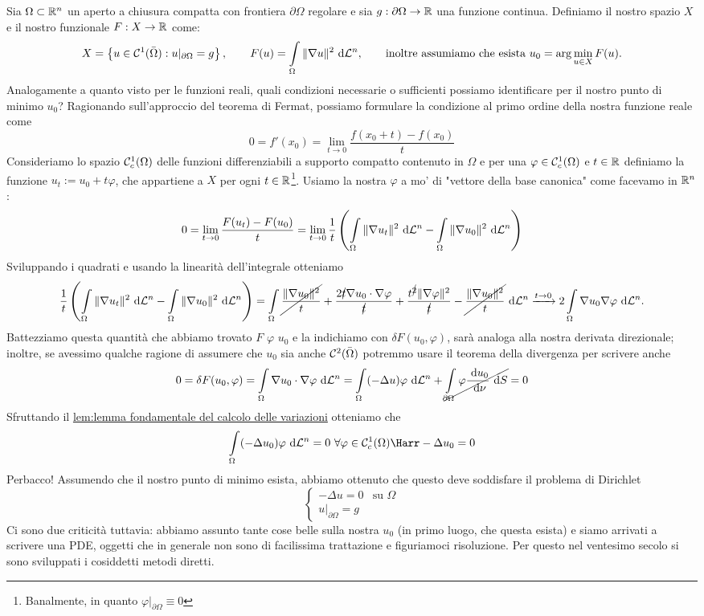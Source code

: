 \documentclass[openany]{book}
\begin{document}
Sia $\Omega\subset\mathbb{R}^n$ un aperto a chiusura compatta con frontiera $\partial\Omega$ regolare e sia $g : \partial\Omega\to\mathbb{R}$ una funzione continua. Definiamo il nostro spazio $X$ e il nostro funzionale $F : X\to\mathbb{R}$ come:
\[ X = \left\{ u \in \mc{C}^1(\bar{\Omega}) : u|_{\partial\Omega} = g \right\}, \qquad F(u) = \intop_\Omega \|\nabla u\|^2 \de \L^n, \qquad\text{inoltre assumiamo che esista } u_0 = \arg\min_{u \in X} F(u). \]
Analogamente a quanto visto per le funzioni reali, quali condizioni necessarie o sufficienti possiamo identificare per il nostro punto di minimo $u_0$? Ragionando sull'approccio del teorema di Fermat, possiamo formulare la condizione al primo ordine della nostra funzione reale come 
\[ 0 = f'(x_0) = \lim_{t\to 0} \frac{f(x_0+t) - f(x_0)}{t} \]
Consideriamo lo spazio $\mathcal{C}^1_c(\Omega)$ delle funzioni differenziabili a supporto compatto contenuto in $\Omega$ e per una $\varphi \in \mathcal{C}^1_c(\Omega)$ e $t \in \mathbb{R}$ definiamo la funzione $u_t := u_0 + t\varphi$, che appartiene a $X$ per ogni $t \in \mathbb{R}$\footnote{Banalmente, in quanto $\varphi|_{\partial\Omega} \equiv 0$}. Usiamo la nostra $\varphi$ a mo' di "vettore della base canonica" come facevamo in $\mathbb{R}^n$:
\[0 = \lim_{t\to 0} \frac{F(u_t) - F(u_0)}{t} = \lim_{t\to 0} \frac{1}{t} \left( \intop_\Omega \|\nabla u_t\|^2 \de \L^n - \intop_\Omega \|\nabla u_0\|^2 \de \L^n \right)\]
Sviluppando i quadrati e usando la linearità dell'integrale otteniamo
\[ \frac{1}{t} \left( \intop_\Omega \|\nabla u_t\|^2 \de \L^n - \intop_\Omega \|\nabla u_0\|^2 \de \L^n \right) =  \intop_\Omega \cancel{\frac{\|\nabla u_0\|^2}{t}} + \frac{2\cancel{t} \nabla u_0 \cdot \nabla \varphi}{\cancel{t}} + \frac{t^{\cancel{2}}\|\nabla \varphi\|^2}{\cancel{t}} -\cancel{\frac{\|\nabla u_0\|^2}{t}} \de \L^n \xrightarrow{t \to 0} 2\intop_\Omega \nabla u_0 \nabla \varphi \de\L^n.\]
Battezziamo questa quantità che abbiamo trovato  $F$  $\varphi$  $u_0$ e la indichiamo con $\delta F(u_0,\varphi)$, sarà analoga alla nostra derivata direzionale; inoltre, se avessimo qualche ragione di assumere che $u_0$ sia anche $\mathcal{C}^2(\bar{\Omega})$ potremmo usare il teorema della divergenza per scrivere anche
\[ 0 = \delta F(u_0,\varphi) = \intop_{\Omega} \nabla u_0 \cdot \nabla\varphi \de\L^n = \intop_{\Omega}(-\Delta u)\varphi \de\L^n + \cancel{\intop_{\partial\Omega} \varphi \frac{\de u_0}{\de \nu} \de S } = 0\]
Sfruttando il \href{lemma fondamentale cdv}{lem:lemma fondamentale del calcolo delle variazioni} otteniamo che
\[ \intop_{\Omega} (-\Delta u_0) \varphi \de\L^n = 0\ \forall \varphi \in \mc{C}^1_c(\Omega)  \Harr -\Delta u_0 = 0 \]
Perbacco! Assumendo che il nostro punto di minimo esista, abbiamo ottenuto che questo deve soddisfare il problema di Dirichlet
\[ \begin{cases} -\Delta u = 0 & \text{su }\Omega \\ u|_{\partial\Omega} = g \end{cases}\]
Ci sono due criticità tuttavia: abbiamo assunto tante cose belle sulla nostra $u_0$ (in primo luogo, che questa esista) e siamo arrivati a scrivere una PDE, oggetti che in generale non sono di facilissima trattazione e figuriamoci risoluzione. Per questo nel ventesimo secolo si sono sviluppati i cosiddetti metodi diretti.
\end{document}
